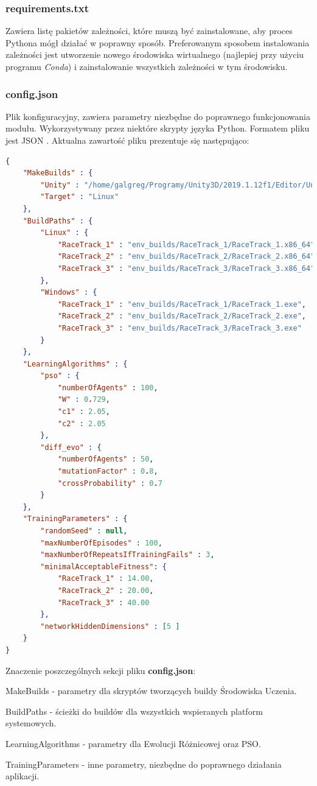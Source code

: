 \subsubsection{requirements.txt}
Zawiera listę pakietów zależności, które muszą być zainstalowane, aby proces Pythona mógł działać w poprawny sposób. Preferowanym sposobem instalowania zależności jest utworzenie nowego środowiska wirtualnego (najlepiej przy użyciu programu \textit{Conda}) i zainstalowanie wszystkich zależności w tym środowisku.

\subsubsection{config.json}
Plik konfiguracyjny, zawiera parametry niezbędne do poprawnego funkcjonowania modułu. Wykorzystywany przez niektóre skrypty języka Python. Formatem pliku jest JSON \cite{json:standard}. Aktualna zawartość pliku prezentuje się następująco:

\vspace{1cm}
\begin{lstlisting}[language=json]
{
    "MakeBuilds" : {
        "Unity" : "/home/galgreg/Programy/Unity3D/2019.1.12f1/Editor/Unity",
        "Target" : "Linux"
    },
    "BuildPaths" : {
        "Linux" : {
            "RaceTrack_1" : "env_builds/RaceTrack_1/RaceTrack_1.x86_64",
            "RaceTrack_2" : "env_builds/RaceTrack_2/RaceTrack_2.x86_64",
            "RaceTrack_3" : "env_builds/RaceTrack_3/RaceTrack_3.x86_64"
        },
        "Windows" : {
            "RaceTrack_1" : "env_builds/RaceTrack_1/RaceTrack_1.exe",
            "RaceTrack_2" : "env_builds/RaceTrack_2/RaceTrack_2.exe",
            "RaceTrack_3" : "env_builds/RaceTrack_3/RaceTrack_3.exe"
        }
    },
    "LearningAlgorithms" : {
        "pso" : {
            "numberOfAgents" : 100,
            "W" : 0.729,
            "c1" : 2.05,
            "c2" : 2.05
        },
        "diff_evo" : {
            "numberOfAgents" : 50,
            "mutationFactor" : 0.8,
            "crossProbability" : 0.7
        }
    },
    "TrainingParameters" : {
        "randomSeed" : null,
        "maxNumberOfEpisodes" : 100,
        "maxNumberOfRepeatsIfTrainingFails" : 3,
        "minimalAcceptableFitness": {
            "RaceTrack_1" : 14.00,
            "RaceTrack_2" : 20.00,
            "RaceTrack_3" : 40.00
        },
        "networkHiddenDimensions" : [5 ]
    }
}
\end{lstlisting}

\newpage
Znaczenie poszczególnych sekcji pliku \textbf{config.json}:
\begin{itemize*}
\item MakeBuilds - parametry dla skryptów tworzących buildy Środowiska Uczenia.
\item BuildPaths - ścieżki do buildów dla wszystkich wspieranych platform systemowych.
\item LearningAlgorithms - parametry dla Ewolucji Różnicowej oraz PSO.
\item TrainingParameters - inne parametry, niezbędne do poprawnego działania aplikacji.
\end{itemize*}

